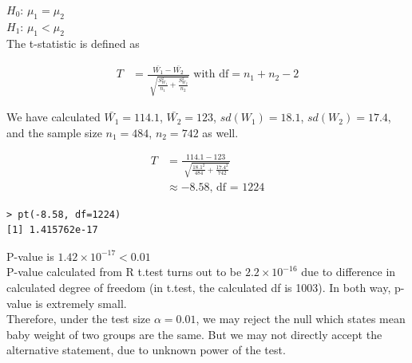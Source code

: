 \documentclass[12pt,letterpaper]{article}
\begin{document}
\noindent $H_0$: $\mu_1 = \mu_2$ \\
\noindent $H_1$: $\mu_1 < \mu_2$ \\

\noindent The t-statistic is defined as 

\begin{align*}
T &= \frac{\bar{W_1}- \bar{W_2}}{\sqrt[]{\frac{S_{W_1}^2}{n_1} + \frac{S_{W_2}^2}{n_2}}} \text{ with df} = n_1 + n_2 - 2
\end{align*}


\noindent We have calculated $\bar{W_1} = 114.1$, $\bar{W_2} = 123$, $sd(W_1) = 18.1$, $sd(W_2) = 17.4$, and the sample size $n_1 = 484$, $n_2 = 742$ as well. 

\begin{align*}
T &= \frac{114.1 - 123}{\sqrt[]{\frac{18.1^2}{484} + \frac{17.4^2}{742}}} \\
&\approx  -8.58 \text{, df = 1224}
\end{align*}

\begin{verbatim}
> pt(-8.58, df=1224)
[1] 1.415762e-17
\end{verbatim}

\noindent P-value is $1.42 \times 10^{-17} < 0.01$\\

\noindent P-value calculated from R t.test turns out to be $2.2 \times 10^{-16}$ due to difference in calculated degree of freedom (in t.test, the calculated df is 1003). In both way, p-value is extremely small. \\

\noindent Therefore, under the test size $\alpha = 0.01$, we may reject the null which states mean baby weight of two groups are the same. But we may not directly accept the alternative statement, due to unknown power of the test.
\end{document}
